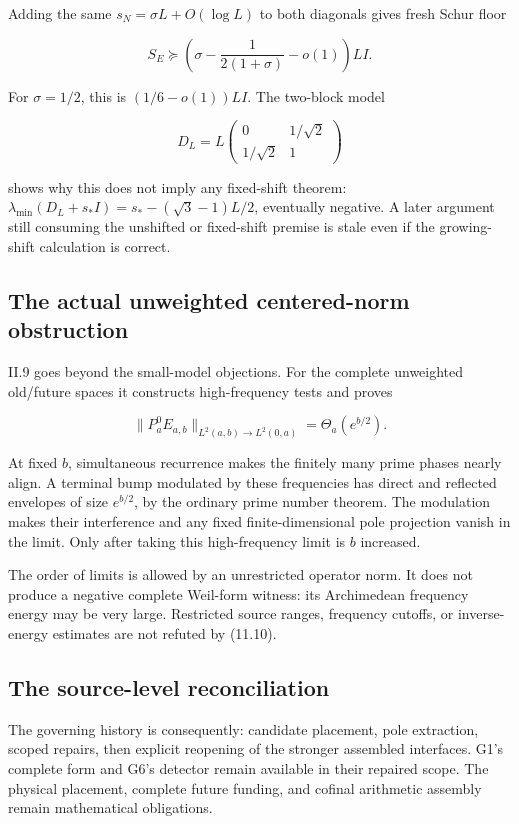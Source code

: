 \documentclass[
  10pt,
  a4paper,
  10pt,
  oneside,
  openany]{book}
\begin{document}
Adding the same \(s_N=\sigma L+O(\log L)\) to both diagonals gives fresh
Schur floor

\[
S_E\succeq
\left(\sigma-\frac1{2(1+\sigma)}-o(1)\right)LI.
\tag{11.8}\label{eq:11.8}
\]

For \(\sigma=1/2\), this is \((1/6-o(1))LI\). The two-block model

\[
D_L=L\begin{pmatrix}0&1/\sqrt2\\1/\sqrt2&1\end{pmatrix}
\tag{11.9}\label{eq:11.9}
\]

shows why this does not imply any fixed-shift theorem:
\(\lambda_{\min}(D_L+s_*I)=s_*-(\sqrt3-1)L/2\), eventually negative. A
later argument still consuming the unshifted or fixed-shift premise is
stale even if the growing-shift calculation is correct.

\subsection{The actual unweighted centered-norm
obstruction}\label{the-actual-unweighted-centered-norm-obstruction}

II.9 goes beyond the small-model objections. For the complete unweighted
old/future spaces it constructs high-frequency tests and proves

\[
\|P_a^0E_{a,b}\|_{L^2(a,b)\to L^2(0,a)}
=\Theta_a(e^{b/2}).
\tag{11.10}\label{eq:11.10}
\]

At fixed \(b\), simultaneous recurrence makes the finitely many prime
phases nearly align. A terminal bump modulated by these frequencies has
direct and reflected envelopes of size \(e^{b/2}\), by the ordinary
prime number theorem. The modulation makes their interference and any
fixed finite-dimensional pole projection vanish in the limit. Only after
taking this high-frequency limit is \(b\) increased.

The order of limits is allowed by an unrestricted operator norm. It does
not produce a negative complete Weil-form witness: its Archimedean
frequency energy may be very large. Restricted source ranges, frequency
cutoffs, or inverse-energy estimates are not refuted by (11.10).

\subsection{The source-level
reconciliation}\label{the-source-level-reconciliation}

The governing history is consequently: candidate placement, pole
extraction, scoped repairs, then explicit reopening of the stronger
assembled interfaces. G1's complete form and G6's detector remain
available in their repaired scope. The physical placement, complete
future funding, and cofinal arithmetic assembly remain mathematical
obligations.
\end{document}

